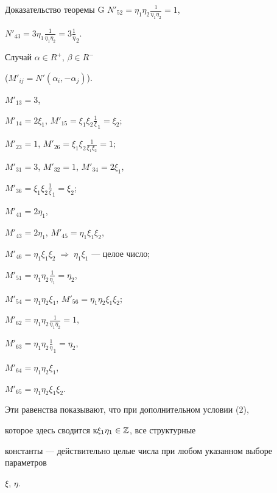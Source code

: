 \begin{pf*}{Доказательство теоремы G}
$N'_{52}=\eta_1\eta_2\frac1{\eta_1\eta_2}=1$,


$N'_{43}=3\eta_1\frac1{\eta_1\eta_2}=3\frac1\eta_2$.





Случай $\alpha\in R^+$, $\beta\in R^-$


($M'_{ij}=N'(\alpha_i,-\alpha_j)$).





\noindent{}$M'_{13}=3$, 


$M'_{14}=2\xi_1$, $M'_{15}=\xi_1\xi_2\frac1\xi_1=\xi_2$;


$M'_{23}=1$, $M'_{26}=\xi_1\xi_2\frac1{\xi_1\xi_2}=1$;





\noindent{}$M'_{31}=3$, $M'_{32}=1$, $M'_{34}=2\xi_1$,


$M'_{36}=\xi_1\xi_2\frac1\xi_1=\xi_2$;





\noindent{}$M'_{41}=2\eta_1$, 


$M'_{43}=2\eta_1$, $M'_{45}=\eta_1\xi_1\xi_2$,


$M'_{46}=\eta_1\xi_1\xi_2\;\Rightarrow\;\eta_1\xi_1$ --- целое число;





\noindent{}$M'_{51}=\eta_1\eta_2\frac1{\eta_1}=\eta_2$,


$M'_{54}=\eta_1\eta_2\xi_1$, $M'_{56}=\eta_1\eta_2\xi_1\xi_2$;





\noindent{}$M'_{62}=\eta_1\eta_2\frac1{\eta_1\eta_2}=1$,


$M'_{63}=\eta_1\eta_2\frac1\eta_1=\eta_2$,


$M'_{64}=\eta_1\eta_2\xi_1$,


$M'_{65}=\eta_1\eta_2\xi_1\xi_2$.





\noindent{}Эти равенства показывают, что при дополнительном условии (2),


которое здесь сводится к\linebreak $\xi_1\eta_1\in\Bbb Z$, все структурные


константы --- действительно целые числа при любом указанном выборе параметров


$\xi$, $\eta$.






\end{pf*}
